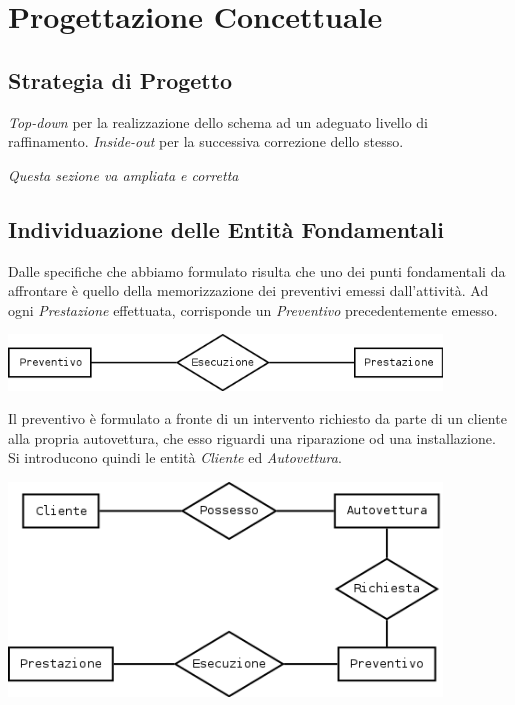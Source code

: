 \section{Progettazione Concettuale}
	
	\subsection{Strategia di Progetto}
		\emph{Top-down} per la realizzazione dello schema ad un adeguato livello di raffinamento. \emph{Inside-out} per la successiva correzione dello stesso.
		
		\emph{Questa sezione va ampliata e corretta}
		
	\subsection{Individuazione delle Entità Fondamentali}
		
		Dalle specifiche che abbiamo formulato risulta che uno dei punti fondamentali da affrontare è quello della memorizzazione dei preventivi emessi dall'attività.
		Ad ogni \emph{Prestazione} effettuata, corrisponde un \emph{Preventivo} precedentemente emesso.
		
		\vspace{0.5cm}
		\includegraphics[width=11.5cm]{images/diagrams/preventivo_prestazione.png}
		\vspace{0.3cm}
		
		Il preventivo è formulato a fronte di un intervento richiesto da parte di un cliente alla propria autovettura, che esso riguardi una riparazione od una installazione. Si introducono quindi le entità \emph{Cliente} ed \emph{Autovettura}.
		
		\vspace{0.5cm}
		\includegraphics[width=11.5cm]{images/diagrams/cliente_prestazione.png}
		\vspace{0.3cm}
		
